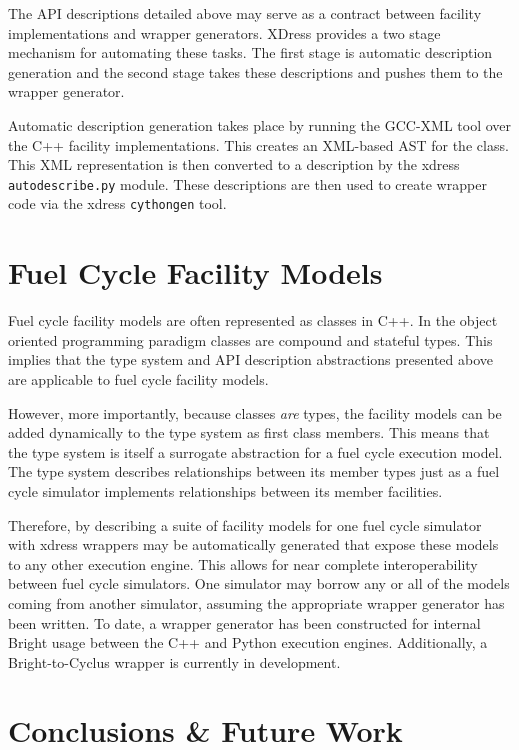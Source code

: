 \documentclass{ansconfpaper}
\newcommand{\vin}[1]{\texttt{{#1}}}
\begin{document}
The API descriptions detailed above may serve as a contract between facility 
implementations and wrapper generators.  XDress provides a two stage mechanism 
for automating these tasks.  The first stage is automatic description generation 
and the second stage takes these descriptions and pushes them to the wrapper 
generator.  

Automatic description generation takes place by running the GCC-XML
tool \cite{gccxml} over the C++ facility implementations.  This creates an XML-based
AST for the class.  This XML representation \cite{xml} is then converted to a 
description by the xdress \vin{autodescribe.py} module.  These descriptions are
then used to create wrapper code via the xdress \vin{cythongen} tool.


\section{Fuel Cycle Facility Models}
\label{sec:fc}

Fuel cycle facility models are often represented as classes in C++. In the object
oriented programming paradigm classes are compound and stateful types.  This implies 
that the type system and API description abstractions presented above are applicable
to fuel cycle facility models.  

However, more importantly, because classes \emph{are} types, the facility models 
can be added dynamically to the type system as first class members.  This means
that the type system is itself a surrogate abstraction for a fuel cycle execution 
model.  The type system describes relationships between its member types just as 
a fuel cycle simulator implements relationships between its member facilities.

Therefore, by describing a suite of facility models for one fuel cycle simulator with
xdress wrappers may be automatically generated that expose these models to any
other execution engine.  This allows for near complete interoperability between 
fuel cycle simulators.  One simulator may borrow any or all of the models coming 
from another simulator, assuming the appropriate wrapper generator has been written.
To date, a wrapper generator has been constructed for internal Bright usage between
the C++ and Python execution engines.  Additionally, a Bright-to-Cyclus wrapper is 
currently in development.

\section{Conclusions \& Future Work}
\label{sec:conc}
\end{document}
